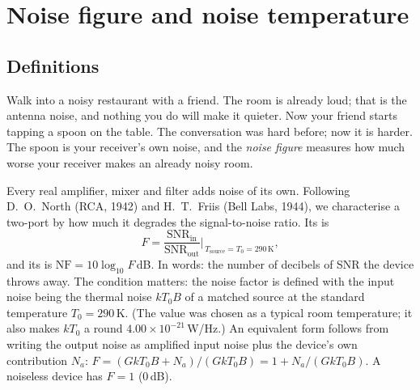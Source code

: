 \section{Noise figure and noise temperature}
\label{sec:ch03:nf}

\subsection{Definitions}

Walk into a noisy restaurant with a friend. The room is already loud; that is the antenna noise, and
nothing you do will make it quieter. Now your friend starts tapping a spoon on the table. The
conversation was hard before; now it is harder. The spoon is your receiver's own noise, and the
\emph{noise figure} measures how much worse your receiver makes an already noisy room.

Every real amplifier, mixer and filter adds noise of its own. Following D.~O.~North (RCA, 1942) and
H.~T.~Friis (Bell Labs, 1944), we characterise a two-port by how much it degrades the signal-to-noise
ratio. Its  is
\begin{equation}
F=\frac{\mathrm{SNR}_{\text{in}}}{\mathrm{SNR}_{\text{out}}}\Bigg|_{\,T_{\text{source}}=T_0=290\,\mathrm K},
\label{eq:ch03:nfdef}
\end{equation}
and its  is $\mathrm{NF}=10\log_{10}F$\,dB. In words: the number of decibels of SNR
the device throws away. The condition matters: the noise factor is defined with the input noise being
the thermal noise $kT_0B$ of a matched source at the standard temperature $T_0=290$\,K. (The value was
chosen as a typical room temperature; it also makes $kT_0$ a round $4.00\times10^{-21}$\,W/Hz.) An
equivalent form follows from writing the output noise as amplified input noise plus the device's own
contribution $N_a$: $F=(GkT_0B+N_a)/(GkT_0B)=1+N_a/(GkT_0B)$. A noiseless device has $F=1$ (0\,dB).

